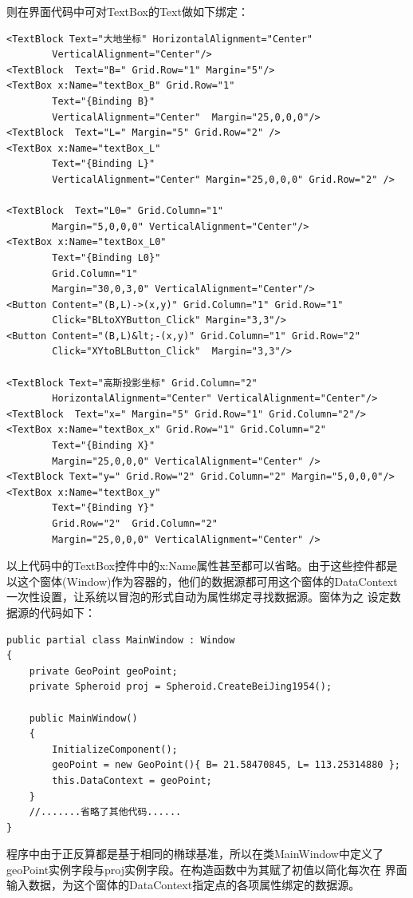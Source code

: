 则在界面代码中可对TextBox的Text做如下绑定：

\begin{lstlisting}
<TextBlock Text="大地坐标" HorizontalAlignment="Center"
        VerticalAlignment="Center"/>
<TextBlock  Text="B=" Grid.Row="1" Margin="5"/>
<TextBox x:Name="textBox_B" Grid.Row="1"
        Text="{Binding B}"
        VerticalAlignment="Center"  Margin="25,0,0,0"/>
<TextBlock  Text="L=" Margin="5" Grid.Row="2" />
<TextBox x:Name="textBox_L"
        Text="{Binding L}"
        VerticalAlignment="Center" Margin="25,0,0,0" Grid.Row="2" />

<TextBlock  Text="L0=" Grid.Column="1"
        Margin="5,0,0,0" VerticalAlignment="Center"/>
<TextBox x:Name="textBox_L0"
        Text="{Binding L0}" 
        Grid.Column="1"
        Margin="30,0,3,0" VerticalAlignment="Center"/>
<Button Content="(B,L)->(x,y)" Grid.Column="1" Grid.Row="1"
        Click="BLtoXYButton_Click" Margin="3,3"/>
<Button Content="(B,L)&lt;-(x,y)" Grid.Column="1" Grid.Row="2"
        Click="XYtoBLButton_Click"  Margin="3,3"/>
        
<TextBlock Text="高斯投影坐标" Grid.Column="2"
        HorizontalAlignment="Center" VerticalAlignment="Center"/>
<TextBlock  Text="x=" Margin="5" Grid.Row="1" Grid.Column="2"/>
<TextBox x:Name="textBox_x" Grid.Row="1" Grid.Column="2"
        Text="{Binding X}"
        Margin="25,0,0,0" VerticalAlignment="Center" />
<TextBlock Text="y=" Grid.Row="2" Grid.Column="2" Margin="5,0,0,0"/>
<TextBox x:Name="textBox_y"
        Text="{Binding Y}"
        Grid.Row="2"  Grid.Column="2"
        Margin="25,0,0,0" VerticalAlignment="Center" />  
\end{lstlisting}

以上代码中的TextBox控件中的x:Name属性甚至都可以省略。由于这些控件都是
以这个窗体(Window)作为容器的，他们的数据源都可用这个窗体的DataContext
一次性设置，让系统以冒泡的形式自动为属性绑定寻找数据源。窗体为之
设定数据源的代码如下：

\begin{lstlisting}
public partial class MainWindow : Window
{
    private GeoPoint geoPoint;
    private Spheroid proj = Spheroid.CreateBeiJing1954();

    public MainWindow()
    {
        InitializeComponent();
        geoPoint = new GeoPoint(){ B= 21.58470845, L= 113.25314880 };
        this.DataContext = geoPoint;
    }
    //.......省略了其他代码......
}
\end{lstlisting}

程序中由于正反算都是基于相同的椭球基准，所以在类MainWindow中定义了
geoPoint实例字段与proj实例字段。在构造函数中为其赋了初值以简化每次在
界面输入数据，为这个窗体的DataContext指定点的各项属性绑定的数据源。

